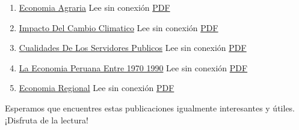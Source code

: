 \documentclass[
  jou,
  floatsintext,
  longtable,
  a4paper,
  nolmodern,
  notxfonts,
  notimes,
  colorlinks=true,linkcolor=blue,citecolor=blue,urlcolor=blue]{apa7}
\begin{document}
\begin{enumerate}
{  Y Modernizacion De La Gestion Publica} Lee sin conexión
  \href{https://achalmaedison.netlify.app/blog/posts/2021-10-01-reformas-y-modernizacion-de-la-gestion-publica/index.pdf}{PDF}
\item
  \href{https://achalmaedison.netlify.app/blog/posts/2022-04-22-economia-agraria}{Economia
  Agraria} Lee sin conexión
  \href{https://achalmaedison.netlify.app/blog/posts/2022-04-22-economia-agraria/index.pdf}{PDF}
\item
  \href{https://achalmaedison.netlify.app/blog/posts/2022-06-02-impacto-del-cambio-climatico}{Impacto
  Del Cambio Climatico} Lee sin conexión
  \href{https://achalmaedison.netlify.app/blog/posts/2022-06-02-impacto-del-cambio-climatico/index.pdf}{PDF}
\item
  \href{https://achalmaedison.netlify.app/blog/posts/2023-05-11-cualidades-de-los-servidores-publicos}{Cualidades
  De Los Servidores Publicos} Lee sin conexión
  \href{https://achalmaedison.netlify.app/blog/posts/2023-05-11-cualidades-de-los-servidores-publicos/index.pdf}{PDF}
\item
  \href{https://achalmaedison.netlify.app/blog/posts/2023-05-12-la-economia-peruana-entre-1970-1990}{La
  Economia Peruana Entre 1970 1990} Lee sin conexión
  \href{https://achalmaedison.netlify.app/blog/posts/2023-05-12-la-economia-peruana-entre-1970-1990/index.pdf}{PDF}
\item
  \href{https://achalmaedison.netlify.app/blog/posts/2023-05-16-economia-regional}{Economia
  Regional} Lee sin conexión
  \href{https://achalmaedison.netlify.app/blog/posts/2023-05-16-economia-regional/index.pdf}{PDF}
\end{enumerate}

Esperamos que encuentres estas publicaciones igualmente interesantes y
útiles. ¡Disfruta de la lectura!
\end{document}
